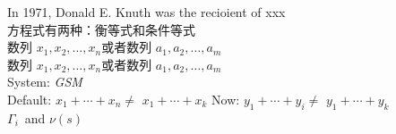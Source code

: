 \documentclass{book}
\begin{document}
\newcommand{\mycmdA}{Donald E. Knuth }
In 1971, \mycmdA was the recioient of xxx\\

\newcommand{\mycmdB}[1]{{\heiti #1}}
方程式有两种：\mycmdB{衡等式}和\mycmdB{条件等式}\\

\newcommand{\mycmdC}[2]{%
$#1_1,#1_2,\dots,#1_#2$}
数列\mycmdC{x}{n}或者数列\mycmdC{a}{m}\\

\newcommand{\mycmdD}[2][n]{%
$#2_1,#2_2,\dots,#2_#1$}
数列\mycmdD{x}或者数列\mycmdD[m]{a}\\

\newcommand{\mycmdE}[2]{#1: \textsl{#2}}
\mycmdE{System}{GSM}
\\
\newcommand{\lvec}{}
\newcommand{\DEFlvec}[2]{\renewcommand{\lvec}[1][#2]{%
\ensuremath{#1_1+\cdots+#1_{##1}}}}
\DEFlvec{x}{n}
Default: $\lvec \neq $\lvec[k]
\DEFlvec{y}{i}
Now: $\lvec \neq $\lvec[k]
\\
\newcommand{\CC}{\ensuremath{\Gamma_{i}}}
\CC\ and $\nu(s)$
\end{document}
